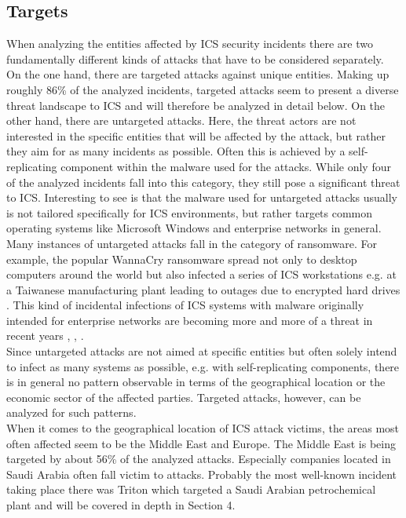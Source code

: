 \documentclass[runningheads]{llncs}
\begin{document}
\subsection{Targets}
When analyzing the entities affected by ICS security incidents there are two fundamentally different kinds of attacks that have to be considered separately.
On the one hand, there are targeted attacks against unique entities.
Making up roughly 86\% of the analyzed incidents, targeted attacks seem to present a diverse threat landscape to ICS and will therefore be analyzed in detail below.
On the other hand, there are untargeted attacks.
Here, the threat actors are not interested in the specific entities that will be affected by the attack, but rather they aim for as many incidents as possible.
Often this is achieved by a self-replicating component within the malware used for the attacks.
While only four of the analyzed incidents fall into this category, they still pose a significant threat to ICS.
Interesting to see is that the malware used for untargeted attacks usually is not tailored specifically for ICS environments, but rather targets common operating systems like Microsoft Windows and enterprise networks in general.
Many instances of untargeted attacks fall in the category of ransomware.
For example, the popular WannaCry ransomware spread not only to desktop computers around the world but also infected a series of ICS workstations e.g. at a Taiwanese manufacturing plant leading to outages due to encrypted hard drives \cite{skybox.18}.
This kind of incidental infections of ICS systems with malware originally intended for enterprise networks are becoming more and more of a threat in recent years \cite{dragos.19}, \cite{cyberx.19}, \cite{zimba.18}.\\
Since untargeted attacks are not aimed at specific entities but often solely intend to infect as many systems as possible, e.g. with self-replicating components, there is in general no pattern observable in terms of the geographical location or the economic sector of the affected parties.
Targeted attacks, however, can be analyzed for such patterns.\\
When it comes to the geographical location of ICS attack victims, the areas most often affected seem to be the Middle East and Europe. The Middle East is being targeted by about 56\% of the analyzed attacks. Especially companies located in Saudi Arabia often fall victim to attacks. Probably the most well-known incident taking place there was Triton which targeted a Saudi Arabian petrochemical plant and will be covered in depth in Section 4.
\end{document}
